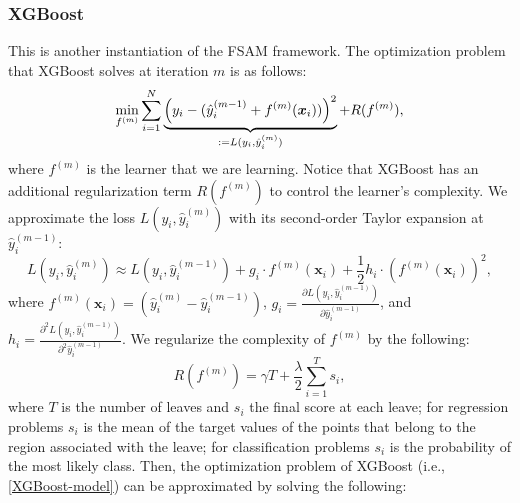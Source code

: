     \subsubsection{XGBoost}
        This is another instantiation of the FSAM framework.
        The optimization problem that XGBoost solves at iteration $m$ is as follows:
            \begin{equation}\label{XGBoost-model}
                \min_{f^{(m)}} \sum_{i=1}^{N}{
                    \underbrace{\left( y_i - (\hat{y}^{(m-1)}_i + f^{(m)}(\bm{x}_i)) \right)^2}_{:=L(y_i, \hat{y}_i^{(m)}) } + R(f^{(m)}),
                }
            \end{equation}
        where $f^{(m)}$ is the learner that we are learning.
        Notice that XGBoost has an additional regularization term $R(f^{(m)})$ to control the learner's complexity.
        We approximate the loss $L(y_i, \hat{y}_i^{(m)})$ with its second-order Taylor expansion at $\hat{y}^{(m-1)}_i$:
            \begin{equation}
                L(y_i, \hat{y}_i^{(m)}) \approx L(y_i, \hat{y}^{(m-1)}_i) + g_i \cdot f^{(m)}(\bm{x}_i) + \frac{1}{2} h_i \cdot (f^{(m)}(\bm{x}_i))^2,
            \end{equation}
        where $f^{(m)}(\bm{x}_i) = (\hat{y}_i^{(m)} - \hat{y}_i^{(m-1)})$, $g_i = \frac{\partial L(y_i, \hat{y}_i^{(m-1)})}{\partial \hat{y}_i^{(m-1)} }$, and $h_i = \frac{\partial^2 L(y_i, \hat{y}_i^{(m-1)})}{\partial^2 \hat{y}_i^{(m-1)} }$.
        We regularize the complexity of $f^{(m)}$ by the following:
            \begin{equation}
                R(f^{(m)}) = \gamma T + \frac{\lambda}{2}\sum_{i=1}^{T}{s_i},
            \end{equation}
        where $T$ is the number of leaves and $s_i$ the final score at each leave; for regression problems $s_i$ is the mean of the target values of the points that belong to the region associated with the leave; for classification problems $s_i$ is the probability of the most likely class.
        Then, the optimization problem of XGBoost (i.e., \eqref{XGBoost-model}) can be approximated by solving the following:
